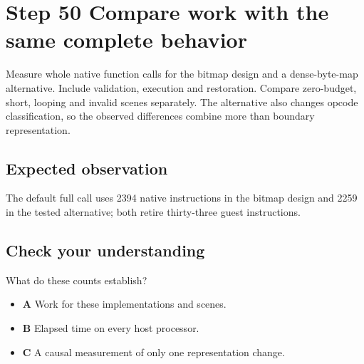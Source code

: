 \section{Step 50 Compare work with the same complete behavior}\label{vm-s50}

Measure whole native function calls for the bitmap design and a dense-byte-map alternative. Include validation, execution and restoration. Compare zero-budget, short, looping and invalid scenes separately. The alternative also changes opcode classification, so the observed differences combine more than boundary representation.

\subsection{Expected observation}
The default full call uses 2394 native instructions in the bitmap design and 2259 in the tested alternative; both retire thirty-three guest instructions.

\subsection{Check your understanding}
What do these counts establish?

\begin{itemize}
  \item \textbf{A} Work for these implementations and scenes.
  \item \textbf{B} Elapsed time on every host processor.
  \item \textbf{C} A causal measurement of only one representation change.
\end{itemize}
